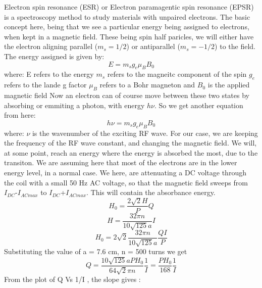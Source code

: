 \documentclass{../_layouts/ieeeconf}
\begin{document}
Electron spin resonance (ESR) or Electron paramagentic spin resonance
(EPSR) is a spectroscopy method to study materials with unpaired
electrons. The basic concept here, being that we see a particular energy
being assigned to electrons, when kept in a magnetic field. These being
spin half paricles, we will either have the electron aligning parallel
(\(m_s = 1/2\)) or antiparallel (\(m_s = -1/2\)) to the field. The
energy assigned is given by: \begin{equation}
    E = m_s g_e \mu_B B_0
\end{equation} where: \newline E refers to the energy \newline \(m_s\)
refers to the magneitc component of the spin \newline \(g_e\) refers to
the lande g factor \newline \(\mu_B\) refers to a Bohr magneton
\newline and \(B_0\) is the applied magnetic field Now an electron can
of course move between these two states by absorbing or emmiting a
photon, with energy \(h\nu\). So we get another equation from here:
\begin{equation}
    h\nu=m_s g_e \mu_B B_0
\end{equation} where: \newline \(\nu\) is the wavenumber of the exciting
RF wave. For our case, we are keeping the frequency of the RF wave
constant, and changing the magnetic field. We will, at some point, reach
an energy where the energy is absorbed the most, due to the transiton.
We are assuming here that most of the electrons are in the lower energy
level, in a normal case. We here, are attenuating a DC voltage through
the coil with a small 50 Hz AC voltage, so that the magnetic field
sweeps from \(I_{DC}\)-\(I_{AC max}\) to \(I_{DC}\)+\(I_{AC max}\). This
will contain the absorbance energy. \begin{equation}
H_0 = \frac{2\sqrt{2}H}{P}Q
\end{equation} \begin{equation}\label{key}
H=\frac{32\pi n}{10\sqrt{125}a}I
\end{equation} \begin{equation}\label{key}
H_0=2\sqrt{2}\frac{32\pi n}{10\sqrt{125}a}\frac{QI}{P}
\end{equation} Substituting the value of a = 7.6 cm, n = 500 turns we
get \begin{equation}\label{key}
Q=\frac{10\sqrt{125}a PH_0}{64\sqrt{2}\pi n }\frac{1}{I}=\frac{PH_0}{168}\frac{1}{I} 
\end{equation} From the plot of Q Vs 1/I , the slope gives :
\end{document}
